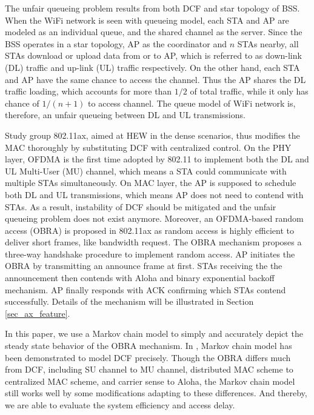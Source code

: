 \documentclass[journal]{IEEEtran}
\begin{document}
The unfair queueing problem results from both DCF and star topology of BSS.
When the WiFi network is seen with queueing model, each STA and AP are modeled as an individual queue, and the shared channel as the server. 
Since the BSS operates in a star topology, AP as the coordinator and $n$ STAs nearby, all STAs download or upload data from or to AP, which is referred to as down-link (DL) traffic and up-link (UL) traffic respectively.
On the other hand, each STA and AP have the same chance to access the channel. 
Thus the AP shares the DL traffic loading, which accounts for more than $1/2$ of total traffic, while it only has chance of $1/(n+1)$ to access channel.
The queue model of WiFi network is, therefore, an unfair queueing between DL and UL transmissions. 


Study group 802.11ax, aimed at HEW in the dense scenarios, thus modifies the MAC thoroughly by substituting DCF with centralized control. 
On the PHY layer, OFDMA is the first time adopted by 802.11 to implement both the DL and UL Multi-User (MU) channel, which means a STA could communicate with multiple STAs simultaneously.
On MAC layer, the AP is supposed to schedule both DL and UL transmissions, which means AP does not need to contend with STAs. 
As a result, instability of DCF should be mitigated and the unfair queueing problem does not exist anymore.
Moreover, an OFDMA-based random access (OBRA) is proposed in 802.11ax as random access is highly efficient to deliver short frames, like bandwidth request. 
The OBRA mechanism proposes a three-way handshake procedure to implement random access.
AP initiates the OBRA by transmitting an announce frame at first. 
STAs receiving the the announcement then contends with Aloha and binary exponential backoff mechanism. 
AP finally responds with ACK confirming which STAs contend successfully.
Details of the mechanism will be illustrated in Section \ref{sec_ax_feature}.



In this paper, we use a Markov chain model to simply and accurately depict the steady state behavior of the OBRA mechanism. 
In \cite{bianchi2000performance}, Markov chain model has been demonstrated to model DCF precisely.
Though the OBRA differs much from DCF, including SU channel to MU channel, distributed MAC scheme to centralized MAC scheme, and carrier sense to Aloha, the Markov chain model still works well by some modifications adapting to these differences.
And thereby, we are able to evaluate the system efficiency and access delay. 
\end{document}
